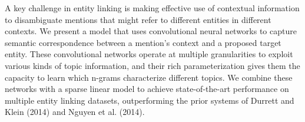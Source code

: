 A key challenge in entity linking is making effective use of contextual 
information to disambiguate mentions that might refer to different entities 
in different contexts. We present a model that uses convolutional neural 
networks to capture semantic correspondence between a mention's context and 
a proposed target entity. These convolutional networks operate at multiple 
granularities to exploit various kinds of topic information, and their rich 
parameterization gives them the capacity to learn which n-grams 
characterize different topics. We combine these networks with a sparse 
linear model to achieve state-of-the-art performance on multiple entity 
linking datasets, outperforming the prior systems of Durrett and 
Klein (2014) and Nguyen et al. (2014).
